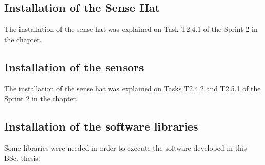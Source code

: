 \subsection{Installation of the Sense Hat}
The installation of the sense hat was explained on Task T2.4.1 of the Sprint 2 in the   chapter.

\subsection{Installation of the sensors}
The installation of the sense hat was explained on Tasks T2.4.2 and T2.5.1 of the Sprint 2 in the   chapter.


\subsection{Installation of the software libraries}
Some libraries were needed in order to execute the software developed in this \ac{BSc.} thesis:
